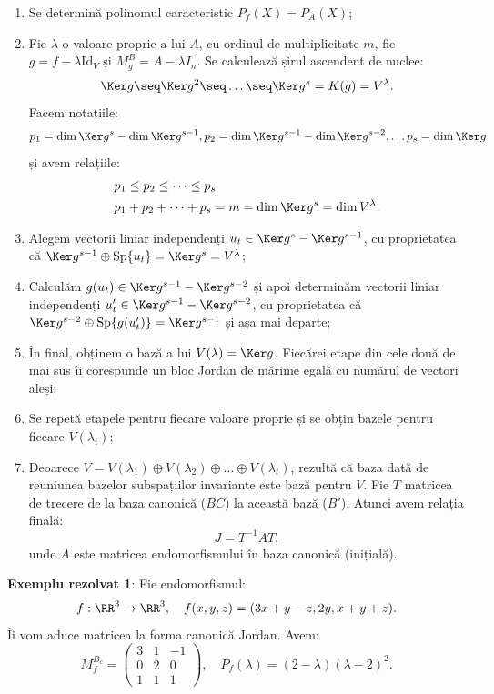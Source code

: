 \begin{enumerate}[(1)]
\item Se determină polinomul caracteristic $P_f(X) = P_A(X)$;
\item Fie $\lambda$ o valoare proprie a lui $A$, cu ordinul de multiplicitate $m$,
  fie $g = f - \lambda \mathrm{Id}_V$ și $M_g^B = A - \lambda I_n$. Se calculează
  șirul ascendent de nuclee:
  \[
    \Ker g \seq \Ker g^2 \seq \dots \seq \Ker g^s = K(g) = V^\lambda.
  \]
  Facem notațiile:
  \[
    p_1 = \dim \Ker g^s - \dim \Ker g^{s-1}, p_2 = \dim \Ker g^{s-1} - \dim \Ker g^{s-2}, \dots %
    p_s = \dim \Ker g
  \]
  și avem relațiile:
  \begin{align*}
    & p_1 \leq p_2 \leq \dots \leq p_s \\
    & p_1 + p_2 + \dots + p_s = m = \dim \Ker g^s = \dim V^\lambda.
  \end{align*}
\item Alegem vectorii liniar independenți $u_t \in \Ker g^s - \Ker g^{s-1}$, cu proprietatea
  că $\Ker g^{s-1} \oplus \mathrm{Sp}\{u_t \} = \Ker g^s = V^\lambda$;
\item Calculăm $g(u_t) \in \Ker g^{s-1} - \Ker g^{s-2}$ și apoi determinăm
  vectorii liniar independenți $u'_t \in \Ker g^{s-1} - \Ker g^{s-2}$, cu proprietatea
  că $\Ker g^{s-2} \oplus \mathrm{Sp}\{ g(u'_t)\} = \Ker g^{s-1}$ și așa mai departe;
\item În final, obținem o bază a lui $V(\lambda) = \Ker g$. Fiecărei etape din cele două
  de mai sus îi corespunde un bloc Jordan de mărime egală cu numărul de vectori aleși;
\item Se repetă etapele pentru fiecare valoare proprie și se obțin bazele pentru fiecare
  $V(\lambda_i)$;
\item Deoarece $V = V(\lambda_1) \oplus V(\lambda_2) \oplus \dots \oplus V(\lambda_t)$, rezultă
  că baza dată de reuniunea bazelor subspațiilor invariante este bază pentru $V$. Fie $T$
  matricea de trecere de la baza canonică ($BC$) la această bază ($B'$). Atunci avem relația finală:
  \[
    J = T^{-1} AT,
  \]
  unde $ A $ este matricea endomorfismului în baza canonică (inițială).
\end{enumerate}


\textbf{Exemplu rezolvat 1}: Fie endomorfismul:
\[
  f : \RR^3 \to \RR^3, \quad f(x,y,z) = (3x + y - z, 2y, x + y + z).
\]
Îi vom aduce matricea la forma canonică Jordan. Avem:
\[
  M_f^{B_c} =
  \begin{pmatrix}
    3 & 1 & -1 \\
    0 & 2 & 0 \\
    1 & 1 & 1
  \end{pmatrix}, \quad P_f(\lambda) = (2 - \lambda)(\lambda-2)^2.
\]

